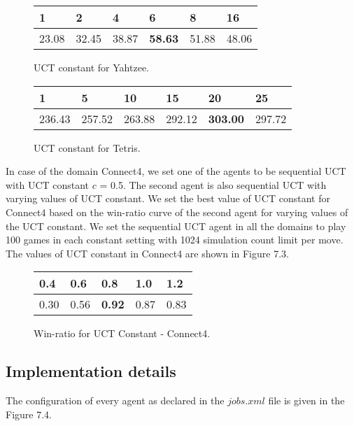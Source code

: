 \documentclass[double,12pt]{beavtex}
\begin{document}
\begin{figure}[!ht]
\centering
 \begin{tabular}{|p{2cm}|p{2cm}|p{2cm}|p{2cm}|p{2cm}|p{2cm}|} 
 \hline
 1 & 2 & 4 & 6 & 8 & 16\\ 
 \hline
 23.08 & 32.45 & 38.87 & \textbf{58.63} & 51.88 & 48.06 \\ 
 \hline
\end{tabular}
\caption{UCT constant for Yahtzee.}
\end{figure}

\begin{figure}[!ht]
\centering
 \begin{tabular}{|p{2cm}|p{2cm}|p{2cm}|p{2cm}|p{2cm}|p{2cm}|} 
 \hline
 1 & 5 & 10 & 15 & 20 & 25\\ 
 \hline
 236.43 & 257.52 & 263.88 & 292.12 & \textbf{303.00} & 297.72 \\ 
 \hline
\end{tabular}
\caption{UCT constant for Tetris.}
\end{figure}

In case of the domain Connect4, we set one of the agents to be sequential UCT with UCT constant $c$ = 0.5. The second agent is also sequential UCT with varying values of UCT constant. We set the best value of UCT constant for Connect4 based on the win-ratio curve of the second agent for varying values of the UCT constant. We set the sequential UCT agent in all the domains to play 100 games in each constant setting with 1024 simulation count limit per move. The values of UCT constant in Connect4 are shown in Figure 7.3.

\begin{figure}[!ht]
\centering
\begin{tabular}{|p{1.5cm}|p{1.5cm}|p{1.5cm}|p{1.5cm}|p{1.5cm}|} 
\hline
0.4 & 0.6 & 0.8 & 1.0 & 1.2 \\ 
\hline
0.30 & 0.56 & \textbf{0.92} & 0.87 & 0.83 \\ 
\hline
\end{tabular}
\caption{Win-ratio for UCT Constant - Connect4.}
\end{figure}

\subsection{Implementation details}
The configuration of every agent as declared in the $jobs.xml$ file is given in the Figure 7.4. 
\end{document}
